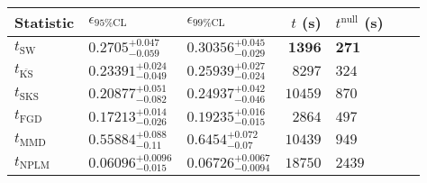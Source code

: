 \begin{tabular}{l|llr|llr}
Statistic & $\epsilon_{95\%\mathrm{CL}}$ & $\epsilon_{99\%\mathrm{CL}}$ & $t$ (s) & $t^{\mathrm{null}}$ (s) \\
	\midrule
	$t_{\mathrm{SW}}$ & $0.2705_{-0.059}^{+0.047}$ & $0.30356_{-0.029}^{+0.045}$ & ${\mathbf{1396}}$ & ${\mathbf{271}}$ \\
	$t_{\overline{\mathrm{KS}}}$ & $0.23391_{-0.049}^{+0.024}$ & $0.25939_{-0.024}^{+0.027}$ & $8297$ & $324$ \\
	$t_{\mathrm{SKS}}$ & $0.20877_{-0.082}^{+0.051}$ & $0.24937_{-0.046}^{+0.042}$ & $10459$ & $870$ \\
	$t_{\mathrm{FGD}}$ & ${\mathbf{0.17213_{-0.026}^{+0.014}}}$ & ${\mathbf{0.19235_{-0.015}^{+0.016}}}$ & $2864$ & $497$ \\
	$t_{\mathrm{MMD}}$ & $0.55884_{-0.11}^{+0.088}$ & $0.6454_{-0.07}^{+0.072}$ & $10439$ & $949$ \\
\rowcolor{red!35}	$t_{\mathrm{NPLM}}$ & $0.06096_{-0.015}^{+0.0096}$ & $0.06726_{-0.0094}^{+0.0067}$ & $18750$ & $2439$ \\
	\bottomrule
\end{tabular}